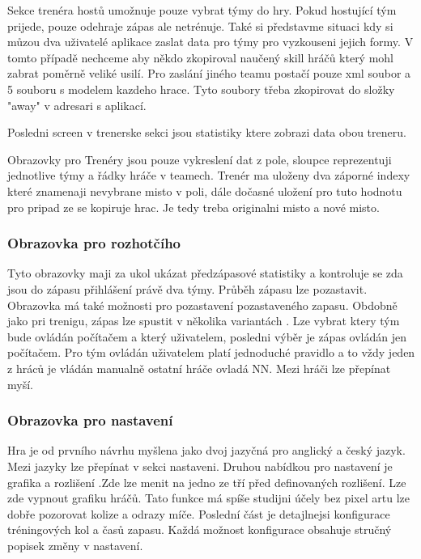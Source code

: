 \documentclass[
  program=ainfk,
  biblatex,
  language=czech,
  figures=true,
  tables ,
  sourcecodes=true,
  glossaries=true,
  index
]{kidiplom}
\begin{document}
Sekce trenéra hostů umožnuje pouze vybrat týmy do hry. Pokud hostující tým prijede, pouze odehraje zápas ale netrénuje. Také si představme situaci kdy si můzou dva uživatelé aplikace zaslat data pro týmy pro vyzkouseni jejich formy. V tomto případě nechceme aby někdo zkopiroval naučený skill hráčů který mohl zabrat poměrně veliké usilí. Pro zaslání  jiného teamu postačí pouze xml soubor a 5 souboru s modelem kazdeho hrace.  Tyto soubory třeba zkopirovat do složky "away" v adresari s aplikací.

Posledni screen v trenerske sekci jsou statistiky ktere zobrazi data obou treneru. 

Obrazovky pro Trenéry jsou pouze vykreslení dat z pole, sloupce reprezentuji jednotlive týmy a řádky hráče v teamech. Trenér ma uloženy dva záporné indexy které znamenaji nevybrane misto v poli, dále dočasné uložení pro tuto hodnotu pro pripad ze se kopiruje hrac. Je tedy treba originalni misto a nové misto. 

 
\subsubsection{Obrazovka pro rozhotčího} 
 
 Tyto obrazovky maji za ukol ukázat předzápasové statistiky a  kontroluje se zda jsou do zápasu přihlášení právě dva týmy. Průběh zápasu lze pozastavit. Obrazovka má také možnosti pro pozastavení pozastaveného zapasu. Obdobně jako pri trenigu, zápas lze spustit v několika variantách . Lze vybrat ktery tým bude ovládán počítačem a který uživatelem, posledni výběr je zápas ovládán jen počítačem. Pro tým ovládán uživatelem platí jednoduché pravidlo a to vždy jeden z hráců je vládán manualně ostatní hráče  ovladá NN. Mezi hráči lze přepínat myší. 

\subsubsection{Obrazovka pro nastavení} 
 
 Hra je od prvního návrhu myšlena jako dvoj jazyčná pro anglický a český jazyk. Mezi jazyky lze přepínat v sekci nastaveni.
Druhou nabídkou pro nastavení je grafika a rozlišení .Zde lze menit na jedno ze tří před definovaných rozlišení. Lze zde vypnout grafiku hráčů. Tato funkce má spíše studijni účely bez pixel artu lze dobře pozorovat kolize a odrazy míče.
Poslední část je detajlnejsi konfigurace tréningových  kol a časů zapasu. Každá možnost konfigurace obsahuje stručný popisek změny v nastavení. 
\end{document}
